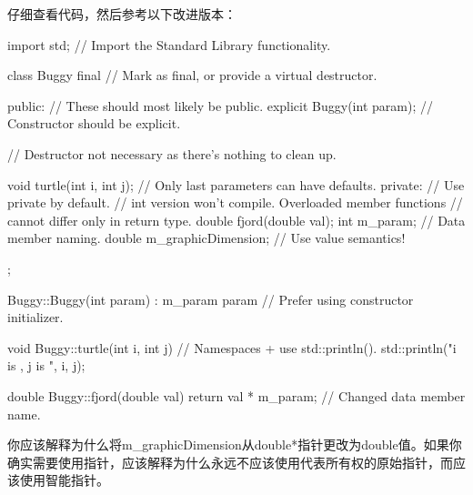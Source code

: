 仔细查看代码，然后参考以下改进版本：

\begin{cpp}
import std; // Import the Standard Library functionality.

class Buggy final // Mark as final, or provide a virtual destructor.
{
    public: // These should most likely be public.
        explicit Buggy(int param); // Constructor should be explicit.

        // Destructor not necessary as there's nothing to clean up.

        void turtle(int i, int j); // Only last parameters can have defaults.
    private: // Use private by default.
        // int version won't compile. Overloaded member functions
        // cannot differ only in return type.
        double fjord(double val);
        int m_param; // Data member naming.
        double m_graphicDimension; // Use value semantics!
};

Buggy::Buggy(int param)
: m_param{ param } // Prefer using constructor initializer.
{}

void Buggy::turtle(int i, int j)
{
    // Namespaces + use std::println().
    std::println("i is {}, j is {}", i, j);
}

double Buggy::fjord(double val)
{
    return val * m_param; // Changed data member name.
}
\end{cpp}

你应该解释为什么将m\_graphicDimension从double*指针更改为double值。如果你确实需要使用指针，应该解释为什么永远不应该使用代表所有权的原始指针，而应该使用智能指针。



